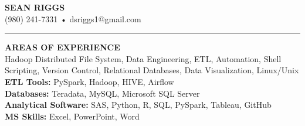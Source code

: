 \documentclass[a4paper,10pt]{article}
\begin{document}
\begin{center}
\textbf{\Large SEAN RIGGS}\\
(980) 241-7331 • dsriggs1@gmail.com\vspace{1mm}\\
\hrule height 2pt
\vspace{2mm}
\end{center}

\noindent
\textbf{AREAS OF EXPERIENCE}\\
Hadoop Distributed File System, Data Engineering, ETL, Automation, Shell Scripting, Version Control, Relational Databases, Data Visualization, Linux/Unix\\
\textbf{ETL Tools:} PySpark, Hadoop, HIVE, Airflow \\
\textbf{Databases:} Teradata, MySQL, Microsoft SQL Server\\
\textbf{Analytical Software:} SAS, Python, R, SQL, PySpark, Tableau, GitHub\\
\textbf{MS Skills:} Excel, PowerPoint, Word\\
\end{document}
